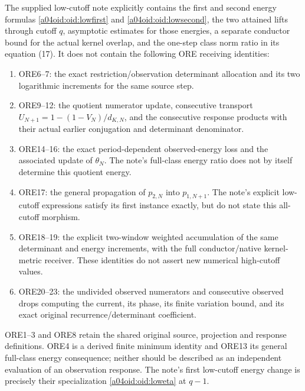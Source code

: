 \documentclass[11pt,a4paper]{article}
\begin{document}
The supplied low-cutoff note explicitly contains the first and second
energy formulas \eqref{a04oid:oid:lowfirst} and \eqref{a04oid:oid:lowsecond}, the
two attained lifts through cutoff $q$, asymptotic estimates for those
energies, a separate conductor bound for the actual kernel overlap,
and the one-step class norm ratio in its equation (17). It does not
contain the following ORE receiving identities:
\begin{enumerate}
\item ORE6--7: the exact restriction/observation determinant allocation
and its two logarithmic increments for the same source step.
\item ORE9--12: the quotient numerator update, consecutive transport
$U_{N+1}=1-(1-V_N)/d_{K,N}$, and the consecutive response products
with their actual earlier conjugation and determinant denominator.
\item ORE14--16: the exact period-dependent observed-energy loss and
the associated update of $\theta_N$. The note's full-class energy
ratio does not by itself determine this quotient energy.
\item ORE17: the general propagation of $p_{2,N}$ into $p_{1,N+1}$.
The note's explicit low-cutoff expressions satisfy its first instance
exactly, but do not state this all-cutoff morphism.
\item ORE18--19: the explicit two-window weighted accumulation of the
same determinant and energy increments, with the full conductor/native
kernel-metric receiver. These identities do not assert new numerical
high-cutoff values.
\item ORE20--23: the undivided observed numerators and consecutive
observed drops computing the current, its phase, its finite variation
bound, and its exact original recurrence/determinant coefficient.
\end{enumerate}
ORE1--3 and ORE8 retain the shared original source, projection and
response definitions. ORE4 is a derived finite minimum identity and
ORE13 its general full-class energy consequence; neither should be
described as an independent evaluation of an observation response.
The note's first low-cutoff energy change is precisely their
specialization \eqref{a04oid:oid:loweta} at $q-1$.
\end{document}
